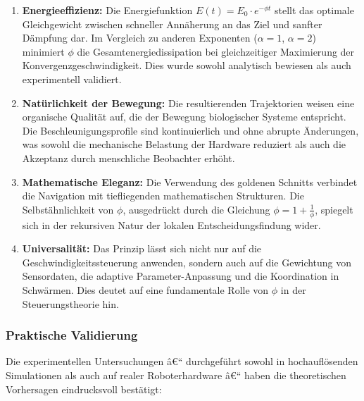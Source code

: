﻿\documentclass[a4paper,12pt]{article}
\theoremstyle{definition}
\begin{document}
\begin{enumerate}
	\item \textbf{Energieeffizienz:} Die Energiefunktion $E(t) = E_0 \cdot e^{-\phi t}$ stellt das optimale Gleichgewicht zwischen schneller Annäherung an das Ziel und sanfter Dämpfung dar. Im Vergleich zu anderen Exponenten ($\alpha = 1$, $\alpha = 2$) minimiert $\phi$ die Gesamtenergiedissipation bei gleichzeitiger Maximierung der Konvergenzgeschwindigkeit. Dies wurde sowohl analytisch bewiesen als auch experimentell validiert.
	
	\item \textbf{Natürlichkeit der Bewegung:} Die resultierenden Trajektorien weisen eine organische Qualität auf, die der Bewegung biologischer Systeme entspricht. Die Beschleunigungsprofile sind kontinuierlich und ohne abrupte Änderungen, was sowohl die mechanische Belastung der Hardware reduziert als auch die Akzeptanz durch menschliche Beobachter erhöht.
	
	\item \textbf{Mathematische Eleganz:} Die Verwendung des goldenen Schnitts verbindet die Navigation mit tiefliegenden mathematischen Strukturen. Die Selbstähnlichkeit von $\phi$, ausgedrückt durch die Gleichung $\phi = 1 + \frac{1}{\phi}$, spiegelt sich in der rekursiven Natur der lokalen Entscheidungsfindung wider.
	
	\item \textbf{Universalität:} Das Prinzip lässt sich nicht nur auf die Geschwindigkeitssteuerung anwenden, sondern auch auf die Gewichtung von Sensordaten, die adaptive Parameter-Anpassung und die Koordination in Schwärmen. Dies deutet auf eine fundamentale Rolle von $\phi$ in der Steuerungstheorie hin.
\end{enumerate}

\subsubsection{Praktische Validierung}

Die experimentellen Untersuchungen â€“ durchgeführt sowohl in hochauflösenden Simulationen als auch auf realer Roboterhardware â€“ haben die theoretischen Vorhersagen eindrucksvoll bestätigt:
\end{document}
